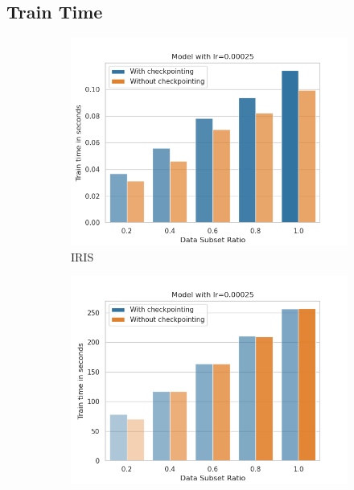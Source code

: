 \newpage
\subsection{Train Time}

\begin{figure}[h]
    \centering
    \begin{subfigure}[b]{0.24\textwidth}
        \centering
        \includegraphics[width=\textwidth]{figures/22_07/iris/train_subset_0.00025.png}
        \caption{IRIS}
        \label{fig:7a}
    \end{subfigure}
    \begin{subfigure}[b]{0.24\textwidth}
        \centering
        \includegraphics[width=\textwidth]{figures/22_07/10ep/train_subset_0.00025.png}

\end{subfigure}
\end{figure}
